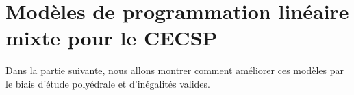 \chapter{Modèles de programmation
linéaire mixte pour le CECSP}







Dans la partie suivante, nous allons montrer comment améliorer ces
modèles par le biais d'étude polyédrale et d'inégalités valides.



